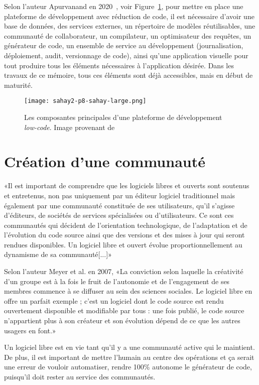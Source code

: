 Selon l'auteur Apurvanand en 2020~\cite{9226356}, voir Figure~\ref{fig:lcnc_plateform_dev}, pour mettre en place une plateforme de développement avec réduction de code, il est nécessaire d'avoir une base de données, des services externes, un répertoire de modèles réutilisables, une communauté de collaborateur, un compilateur, un optimisateur des requêtes, un générateur de code, un ensemble de service au développement (journalisation, déploiement, audit, versionnage de code), ainsi qu'une application visuelle pour tout produire tous les éléments nécessaires à l'application désirée. Dans les travaux de ce mémoire, tous ces éléments sont déjà accessibles, mais en début de maturité.

\begin{figure}[htb]
\centering
\texttt{[image: sahay2-p8-sahay-large.png]}
\caption{Les composantes principales d'une plateforme de développement \textit{low-code}. Image provenant de~\cite{9226356}}
\label{fig:lcnc_plateform_dev}
\end{figure}

\section{Création d’une communauté}

«Il est important de comprendre que les logiciels libres et ouverts sont soutenus et entretenus, non pas uniquement par un éditeur logiciel traditionnel mais également par une communauté constituée de ses utilisateurs, qu'il s'agisse d'éditeurs, de sociétés de services spécialisées ou d'utilisateurs. Ce sont ces communautés qui décident de l'orientation technologique, de l'adaptation et de l'évolution du code source ainsi que des versions et des mises à jour qui seront rendues disponibles. Un logiciel libre et ouvert évolue proportionnellement au dynamisme de sa communauté[...]»~\cite{tresor_gouv_logiciels_libres}

Selon l'auteur Meyer et al. en 2007, «La conviction selon laquelle la créativité d’un groupe est à la fois le fruit de l’autonomie et de l’engagement de ses membres commence à se diffuser au sein des sciences sociales. Le logiciel libre en offre un parfait exemple ; c’est un logiciel dont le code source est rendu ouvertement disponible et modifiable par tous : une fois publié, le code source n’appartient plus à son créateur et son évolution dépend de ce que les autres usagers en font.»~\cite{REDP_173_0387}

Un logiciel libre est en vie tant qu'il y a une communauté active qui le maintient. De plus, il est important de mettre l'humain au centre des opérations et ça serait une erreur de vouloir automatiser, rendre 100\% autonome le générateur de code, puisqu'il doit rester au service des communautés.

